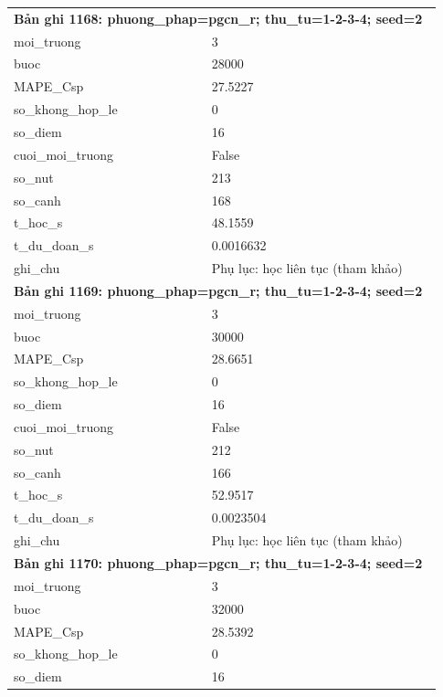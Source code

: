 \begin{longtable}{p{0.43\linewidth}p{0.50\linewidth}}
\midrule
\multicolumn{2}{p{0.95\linewidth}}{\textbf{Bản ghi 1168: phuong\_phap=pgcn\_r; thu\_tu=1-2-3-4; seed=2}} \\
moi\_\allowbreak truong & 3 \\
buoc & 28000 \\
MAPE\_\allowbreak Csp & 27.5227 \\
so\_\allowbreak khong\_\allowbreak hop\_\allowbreak le & 0 \\
so\_\allowbreak diem & 16 \\
cuoi\_\allowbreak moi\_\allowbreak truong & False \\
so\_\allowbreak nut & 213 \\
so\_\allowbreak canh & 168 \\
t\_\allowbreak hoc\_\allowbreak s & 48.1559 \\
t\_\allowbreak du\_\allowbreak doan\_\allowbreak s & 0.0016632 \\
ghi\_\allowbreak chu & Phụ lục: học liên tục (tham khảo) \\
\midrule
\multicolumn{2}{p{0.95\linewidth}}{\textbf{Bản ghi 1169: phuong\_phap=pgcn\_r; thu\_tu=1-2-3-4; seed=2}} \\
moi\_\allowbreak truong & 3 \\
buoc & 30000 \\
MAPE\_\allowbreak Csp & 28.6651 \\
so\_\allowbreak khong\_\allowbreak hop\_\allowbreak le & 0 \\
so\_\allowbreak diem & 16 \\
cuoi\_\allowbreak moi\_\allowbreak truong & False \\
so\_\allowbreak nut & 212 \\
so\_\allowbreak canh & 166 \\
t\_\allowbreak hoc\_\allowbreak s & 52.9517 \\
t\_\allowbreak du\_\allowbreak doan\_\allowbreak s & 0.0023504 \\
ghi\_\allowbreak chu & Phụ lục: học liên tục (tham khảo) \\
\midrule
\multicolumn{2}{p{0.95\linewidth}}{\textbf{Bản ghi 1170: phuong\_phap=pgcn\_r; thu\_tu=1-2-3-4; seed=2}} \\
moi\_\allowbreak truong & 3 \\
buoc & 32000 \\
MAPE\_\allowbreak Csp & 28.5392 \\
so\_\allowbreak khong\_\allowbreak hop\_\allowbreak le & 0 \\
so\_\allowbreak diem & 16 \\

\end{longtable}
